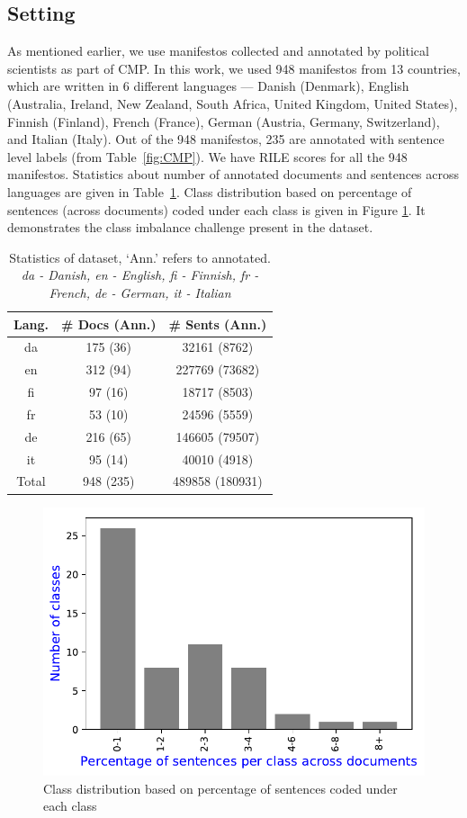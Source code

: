 \documentclass[11pt,a4paper]{article}
\newcommand{\tabref}[2][]{Table#1~\ref{#2}\xspace}
\begin{document}
\subsection{Setting}
As mentioned earlier, we use manifestos collected and annotated by political scientists as part of CMP. In this work, we used 948 manifestos from 13 countries, which are written in 6 different languages --- Danish (Denmark), English (Australia, Ireland, New Zealand, South Africa, United Kingdom, United States), Finnish (Finland), French (France), German (Austria, Germany, Switzerland), and Italian (Italy). Out of the 948 manifestos, 235 are annotated with sentence level labels (from \tabref{fig:CMP}). We have RILE scores for all the 948 manifestos. Statistics about number of annotated documents and sentences across languages are given in \tabref{tab:al}. Class distribution based on percentage of sentences (across documents) coded under each class is given in Figure \ref{fig:cd}. It demonstrates the class imbalance challenge present in the dataset.

 \begin{table}[!htp]
  \centering
  \begin{tabular}{ c c c }
  \toprule
    Lang. & \# Docs (Ann.) & \# Sents (Ann.)\\
    \midrule
    da  & 175 (36)  &  32161 (8762)	\\
    en   &  312 (94)& 227769 (73682) 	 \\    	
    fi  &  97 (16) &  18717 (8503) \\
    fr    & 53 (10) & 24596 (5559)\\
    de    & 216 (65) & 146605 (79507) \\
    it    & 95 (14)  & 40010 (4918)\\
\midrule
 Total    & 948 (235)  & 489858 (180931)\\
    \bottomrule

  \end{tabular}
  \caption{Statistics of dataset, `Ann.' refers to annotated. \textit{da - Danish, en - English, fi - Finnish, fr - French, de - German, it - Italian}}
  \label{tab:al}
\end{table}

\begin{figure}[!tb]
\centering
  \includegraphics[width=0.85\linewidth]{classdist.pdf}
  \caption{Class distribution based on percentage of sentences coded under each class}
  \label{fig:cd}
\end{figure}
\end{document}
